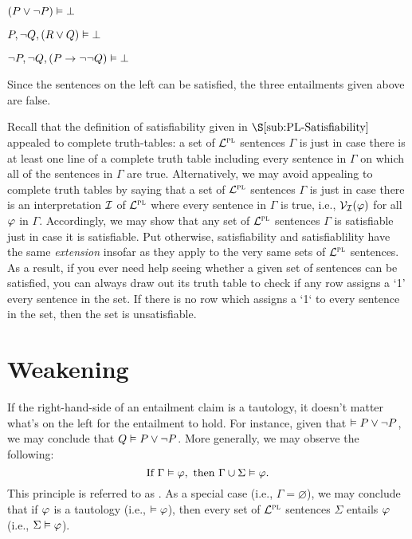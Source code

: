 \begin{earg}
\item[] $(P \vee \neg P) \vDash\bot$
\item[] $P, \neg Q, (R \vee Q) \vDash\bot$
\item[] $\neg P, \neg Q, (P \rightarrow \neg\neg Q) \vDash\bot$
\end{earg}

Since the sentences on the left can be satisfied, the three entailments given above are false.


Recall that the definition of satisfiability given in $\S\ref{sub:PL-Satisfiability}$ appealed to complete truth-tables: a set of $\mathcal{L}^{\textsc{pl}}$ sentences $\Gamma$ is  just in case there is at least one line of a complete truth table including every sentence in $\Gamma$ on which all of the sentences in $\Gamma$ are true.
Alternatively, we may avoid appealing to complete truth tables by saying that a set of $\mathcal{L}^{\textsc{pl}}$ sentences $\Gamma$ is  just in case there is an interpretation $\mathcal{I}$ of $\mathcal{L}^{\textsc{pl}}$ where every sentence in $\Gamma$ is true, i.e., $\mathcal{V}_{\mathcal{I}}(\varphi)$ for all $\varphi$ in $\Gamma$.\label{def.PL-satisfiability}
Accordingly, we may show that any set of $\mathcal{L}^{\textsc{pl}}$ sentences $\Gamma$ is satisfiable just in case it is satisfiable. 
Put otherwise, satisfiability and satisfiablility have the same \textit{extension} insofar as they apply to the very same sets of $\mathcal{L}^{\textsc{pl}}$ sentences.
As a result, if you ever need help seeing whether a given set of sentences can be satisfied, you can always draw out its truth table to check if any row assigns a `1' every sentence in the set.
If there is no row which assigns a `1` to every sentence in the set, then the set is unsatisfiable.






\section{Weakening}

If the right-hand-side of an entailment claim is a tautology, it doesn't matter what's on the left for the entailment to hold.
For instance, given that $\vDash P \vee \neg P$, we may conclude that $Q \vDash P \vee \neg P$.
More generally, we may observe the following:
$$\text{If}~ \Gamma \vDash \varphi, ~\text{then}~ \Gamma \cup \Sigma\vDash \varphi.$$
This principle is referred to as .
As a special case (i.e., $\Gamma=\varnothing$), we may conclude that if $\varphi$ is a tautology (i.e., $\vDash \varphi$), then every set of $\mathcal{L}^{\textsc{pl}}$ sentences $\Sigma$ entails $\varphi$ (i.e., $\Sigma \vDash \varphi$).

